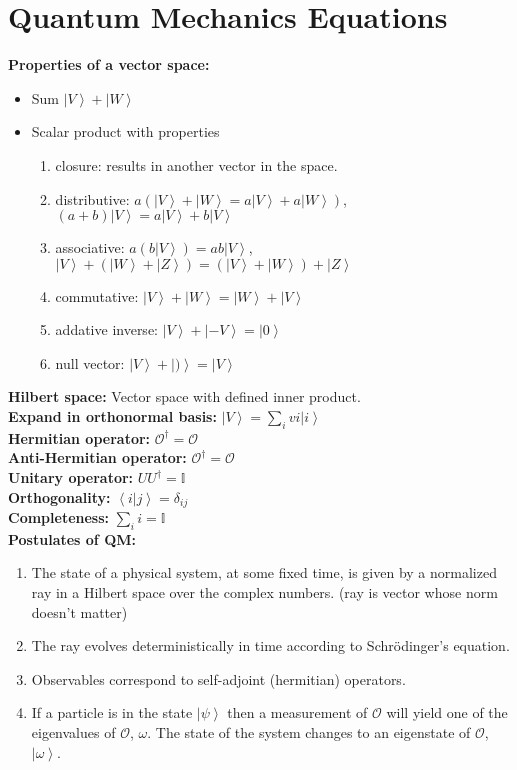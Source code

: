 \documentclass[12pt]{extarticle}
\newcommand{\ket}[1]{\left| #1 \right>}
\newcommand{\braket}[2]{\left< #1 | #2 \right>}
\begin{document}
\section{Quantum Mechanics Equations}
\textbf{Properties of a vector space:}
\begin{itemize}
  \item Sum $\ket{V} + \ket{W}$
  \item Scalar product with properties
  \begin{enumerate}
    \item closure: results in another vector in the space.
    \item distributive: $a(\ket{V}+\ket{W} = a\ket{V}+a\ket{W})$, $(a+b)\ket{V}=a\ket{V}+b\ket{V}$
    \item associative: $a(b\ket{V}) = ab\ket{V}$, $\ket{V}+(\ket{W}+\ket{Z})=(\ket{V}+\ket{W})+\ket{Z}$
    \item commutative: $\ket{V} + \ket{W} = \ket{W} + \ket{V}$
    \item addative inverse: $\ket{V} + \ket{-V} = \ket{0}$
    \item null vector: $\ket{V} + \ket{)} = \ket{V}$
  \end{enumerate}
\end{itemize}
\textbf{Hilbert space:} Vector space with defined inner product. \\
\textbf{Expand in orthonormal basis:}  $\ket{V} = \sum\limits_i vi \ket{i}$ \\
\textbf{Hermitian operator:} $\mathcal{O}^\dagger = \mathcal{O}$ \\
\textbf{Anti-Hermitian operator:} $\mathcal{O}^\dagger = \mathcal{O}$ \\
\textbf{Unitary operator:} $UU^\dagger = \mathbb{I}$ \\
\textbf{Orthogonality:} $\braket{i}{j} = \delta_{ij}$ \\
\textbf{Completeness:} $\sum\limits_ii = \mathbb{I}$ \\
\textbf{Postulates of QM: }
\begin{enumerate}
  \item  The state of a physical system, at some fixed time, is given by a normalized ray in a Hilbert space over the complex numbers. (ray is vector whose norm doesn't matter)
  \item The ray evolves deterministically in time according to Schr\"odinger’s equation.
  \item Observables correspond to self-adjoint (hermitian) operators.
  \item If a particle is in the state $\ket{\psi}$ then a measurement of $\mathcal{O}$ will yield one of the eigenvalues of $\mathcal{O}$, $\omega$. The state of the system changes to an eigenstate of $\mathcal{O}$, $\ket{\omega}$.
\end{enumerate}
\end{document}
